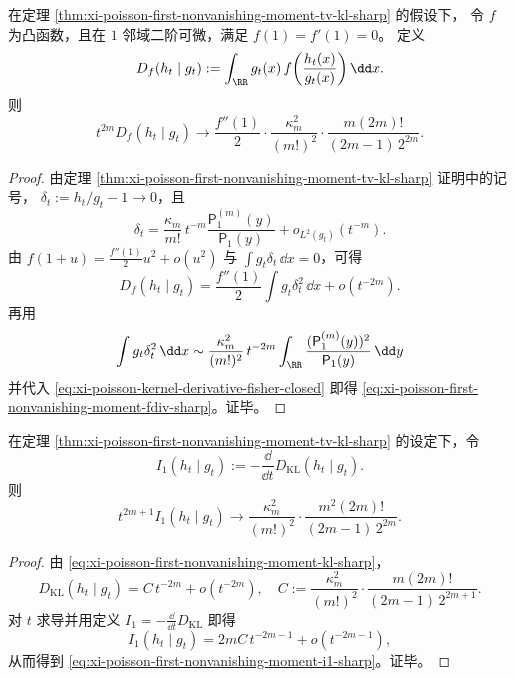 \begin{proposition}\label{prop:xi-poisson-first-nonvanishing-moment-fdiv-sharp}
在定理 \ref{thm:xi-poisson-first-nonvanishing-moment-tv-kl-sharp} 的假设下，
令 \(f\) 为凸函数，且在 \(1\) 邻域二阶可微，满足
\(
f(1)=f'(1)=0
\)。
定义
\[
D_f(h_t\mid g_t):=\int_{\RR}g_t(x)\,
f\!\left(\frac{h_t(x)}{g_t(x)}\right)\dd x.
\]
则
\begin{equation}\label{eq:xi-poisson-first-nonvanishing-moment-fdiv-sharp}
t^{2m}D_f(h_t\mid g_t)
\longrightarrow
\frac{f''(1)}{2}\cdot\frac{\kappa_m^2}{(m!)^2}\cdot
\frac{m(2m)!}{(2m-1)\,2^{2m}}.
\end{equation}
\end{proposition}
\begin{proof}
由定理 \ref{thm:xi-poisson-first-nonvanishing-moment-tv-kl-sharp} 证明中的记号，
\(\delta_t:=h_t/g_t-1\to 0\)，且
\[
\delta_t
=\frac{\kappa_m}{m!}\,t^{-m}\frac{\mathsf P_1^{(m)}(y)}{\mathsf P_1(y)}
+o_{L^2(g_t)}(t^{-m}).
\]
由
\(
f(1+u)=\frac{f''(1)}2u^2+o(u^2)
\)
与 \(\int g_t\delta_t\,\dd x=0\)，可得
\[
D_f(h_t\mid g_t)
=\frac{f''(1)}2\int g_t\delta_t^2\,\dd x+o(t^{-2m}).
\]
再用
\[
\int g_t\delta_t^2\,\dd x
\sim
\frac{\kappa_m^2}{(m!)^2}\,t^{-2m}
\int_{\RR}\frac{(\mathsf P_1^{(m)}(y))^2}{\mathsf P_1(y)}\,\dd y
\]
并代入 \eqref{eq:xi-poisson-kernel-derivative-fisher-closed} 即得
\eqref{eq:xi-poisson-first-nonvanishing-moment-fdiv-sharp}。证毕。
\end{proof}

\begin{corollary}\label{cor:xi-poisson-first-nonvanishing-moment-i1-sharp}
在定理 \ref{thm:xi-poisson-first-nonvanishing-moment-tv-kl-sharp} 的设定下，令
\[
I_1(h_t\mid g_t):=-\frac{\dd}{\dd t}D_{\mathrm{KL}}(h_t\mid g_t).
\]
则
\begin{equation}\label{eq:xi-poisson-first-nonvanishing-moment-i1-sharp}
t^{2m+1}I_1(h_t\mid g_t)
\longrightarrow
\frac{\kappa_m^2}{(m!)^2}\cdot
\frac{m^2(2m)!}{(2m-1)\,2^{2m}}.
\end{equation}
\end{corollary}
\begin{proof}
由 \eqref{eq:xi-poisson-first-nonvanishing-moment-kl-sharp}，
\[
D_{\mathrm{KL}}(h_t\mid g_t)=C\,t^{-2m}+o(t^{-2m}),
\quad
C:=\frac{\kappa_m^2}{(m!)^2}\cdot\frac{m(2m)!}{(2m-1)\,2^{2m+1}}.
\]
对 \(t\) 求导并用定义
\(
I_1=-\frac{\dd}{\dd t}D_{\mathrm{KL}}
\)
即得
\[
I_1(h_t\mid g_t)=2mC\,t^{-2m-1}+o(t^{-2m-1}),
\]
从而得到 \eqref{eq:xi-poisson-first-nonvanishing-moment-i1-sharp}。证毕。
\end{proof}

